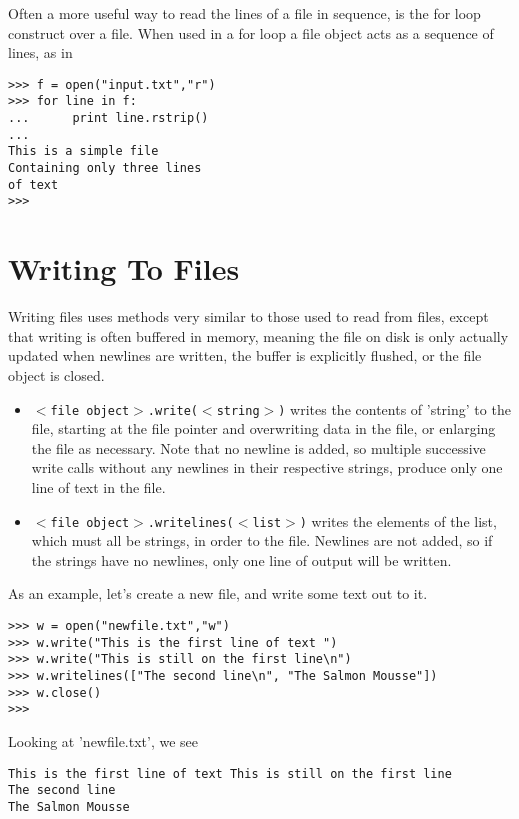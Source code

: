 \documentclass[a4paper,11pt]{article}
\begin{document}
Often a more useful way to read the lines of a file in sequence, is   the for loop construct over a file. When used in a for loop a file   object acts as a sequence of lines, as in
\begin{lstlisting}
>>> f = open("input.txt","r")
>>> for line in f:
...		 print line.rstrip()
... 
This is a simple file
Containing only three lines
of text
>>>\end{lstlisting}

\section{Writing To Files}

Writing files uses methods very similar to those used to read from   files, except that writing is often buffered in memory, meaning the   file on disk is only actually updated when newlines are written, the   buffer is explicitly flushed, or the file object is closed.
\begin{itemize}
	\item 
\texttt{$<$file object$>$.write($<$string$>$)} writes    the contents of 'string' to the file, starting at the file pointer    and overwriting data in the file, or enlarging the file as    necessary. Note that no newline is added, so multiple successive    write calls without any newlines in their respective strings,    produce only one line of text in the file.
	\item 
\texttt{$<$file object$>$.writelines($<$list$>$)}    writes the elements of the list, which must all be strings, in    order to the file. Newlines are not added, so if the strings have    no newlines, only one line of output will be written.
\end{itemize}

As an example, let's create a new file, and write some text out to   it.
\begin{lstlisting}
>>> w = open("newfile.txt","w")
>>> w.write("This is the first line of text ")
>>> w.write("This is still on the first line\n")
>>> w.writelines(["The second line\n", "The Salmon Mousse"])
>>> w.close()
>>> \end{lstlisting}

Looking at 'newfile.txt', we see
\begin{lstlisting}
This is the first line of text This is still on the first line
The second line
The Salmon Mousse\end{lstlisting}
\end{document}
